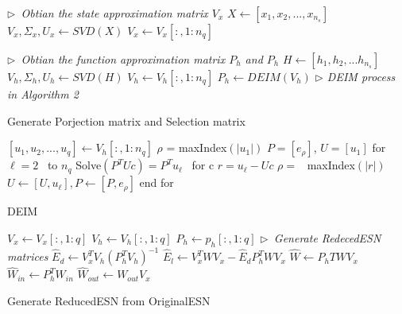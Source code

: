 \begin{algorithm}
\emph{$\triangleright$\ Obtian the state approximation matrix \(V_x\)}\;
$ X \leftarrow [x_1,x_2,...,x_{n_s}]$	\;
$ V_x,\Sigma_x,U_x \leftarrow SVD(X)$	\;
$ V_x \leftarrow V_x[:,1:n_q]$	\;

\emph{$\triangleright$\ Obtian the function approximation matrix \(P_h\) and \(P_h\)}\;
$ H \leftarrow [h_1,h_2,...h_{n_s}] $	\;
$ V_h,\Sigma_h,U_h \leftarrow SVD(H)$	\;
$ V_h \leftarrow V_h[:,1:n_q]$	\;
$ P_h  \leftarrow DEIM(V_h)$	\qquad \emph{$\triangleright$ DEIM process in Algorithm 2}\;

 \caption{Generate Porjection matrix and Selection matrix}
 \label{alg:GenPUV}
\end{algorithm}
\begin{algorithm}
$[u_1,u_2,...,u_q] \leftarrow V_h[:,1:n_q]$	\;
$\rho$ = maxIndex$(|u_1|)$							\;
$P = [e_{\rho}]$, \quad $U = [u_1]$			\;
for $\ell = 2$ \ to \(n_q\) 							\;
\qquad	Solve$(P^T U c) = P^T u_{\ell}$ \ for c	\;
\qquad	$r = u_{\ell} -Uc$						\;
\qquad	$\rho =$ \ maxIndex$(|r|)$						\;
\qquad	$U \leftarrow [U,u_{\ell}], P \leftarrow [P,e_{\rho}]$		\;
end for	
 \caption{DEIM}
 \label{alg:deim}
\end{algorithm}



\begin{algorithm}

 $V_x \leftarrow V_x[:,1:q]$	\;
 $V_h \leftarrow V_h[:,1:q]$	\;
 $P_h \leftarrow p_h[:,1:q]$	\;
 \emph{$\triangleright$\ Generate RedecedESN matrices	}	\;
$\widehat{E}_d \leftarrow V_x^T V_h (P_h^T V_h)^{-1}$	\;
$\widehat{E}_l \leftarrow V_x^T W V_x - \widehat{E}_d P_h^T W V_x$	\;
$\widehat{W} \leftarrow P_hT W V_x$	\;
$\widehat{W}_{in} \leftarrow P_h^T W_{in}$	\;
$\widehat{W}_{out} \leftarrow W_{out}V_x$	\;

 \caption{Generate ReducedESN from OriginalESN}
 \label{alg:GenESN}
\end{algorithm}

